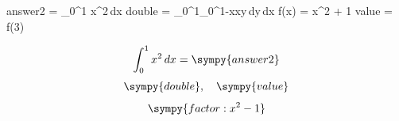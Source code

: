 \documentclass{article}
\begin{document}
\begin{sympycode}
  answer2 = \int_0^1 x^2\,dx
  double = \int_0^1\int_0^{1-x}xy\,dy\,dx
  f(x) = x^2 + 1
  value = f(3)
\end{sympycode}
\[\int_0^1 x^2\,dx = \sympy{answer2}\]
\[\sympy{double},\quad \sympy{value}\]
\[\sympy{factor: x^2-1}\]
\end{document}
